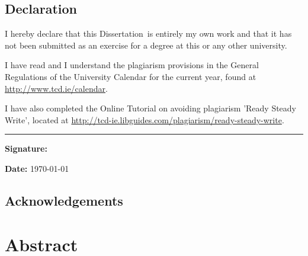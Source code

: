 \documentclass[a4paper,oneside,12pt]{book}
\title{\thesistitle}
\author{\authorname}
\newcommand{\typeofthesis}{Dissertation} %
\begin{document}

\doublespacing

\newpage

\section*{Declaration}
I hereby declare that this \typeofthesis\ is entirely my own work and that it has not been submitted as an exercise for a degree at this or any other university.

I have read and I understand the plagiarism provisions in the General Regulations of the University Calendar for the current year, found at \url{http://www.tcd.ie/calendar}.

I have also completed the Online Tutorial on avoiding plagiarism 'Ready Steady Write', located at \url{http://tcd-ie.libguides.com/plagiarism/ready-steady-write}.

\vspace{.3cm}
\rule{10cm}{.3pt}

\begin{flushleft}
	\begin{minipage}{0.5\linewidth}
		\textbf{Signature:} 
	\end{minipage}
\end{flushleft}
\textbf{Date: } \today
\vspace{.3cm}

\newpage

\section*{Acknowledgements}

\chapter{Abstract}


\newpage

\newpage \tableofcontents
\newpage \listoffigures
\newpage \listoftables

\newpage

\vspace{2cm}

\mainmatter






\appendix
\renewcommand{\thechapter}{A\arabic{chapter}}
\end{document}
